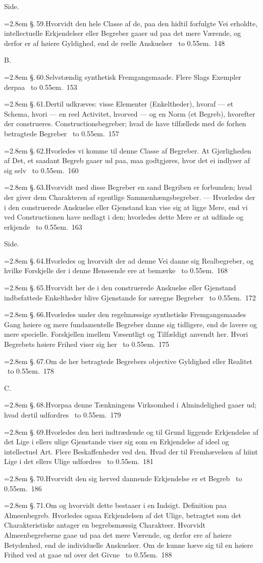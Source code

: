 \documentclass[12pt]{book}
\def\textit#1{#1}%
\def\\{ }%
\newcommand{\ovside}{\par\nopagebreak\hfill{\footnotesize Side.}\par\nobreak\vspace{0.2\baselineskip}}
\newcommand{\ovrubrik}[2]{%
  \par\vspace{0.9\baselineskip}%
  \begin{center}{\textit{#1}\par}\vspace{0.25\baselineskip}{#2\par}\end{center}
  \vspace{0.4\baselineskip}}
\newcommand{\ovline}[3]{%
  \par\vspace{0.25\baselineskip}%
  \noindent\hangindent=2.8em\hangafter=1
  \textit{\S.\,#1.}\quad #2%
  \nobreak\ \leaders\hbox to 0.55em{\hss.\hss}\hfill\ \textit{#3}\par}
\begin{document}
\ovside
\ovline{59}{Hvorvidt den hele Classe af de, paa den hidtil forfulgte Vei
  erholdte, intellectuelle Erkjendelser eller Begreber gaaer ud paa det mere
  Værende, og derfor er af høiere Gyldighed, end de reelle Anskuelser}{148}

\ovrubrik{B.}{Reel Synthese,\\
  eller\\
  reelle Anskuelsers eller Gjenstandes Frembringelse ved en selvstændig
  synthetisk Fremgangsmaade.}
\ovline{60}{Selvstændig synthetisk Fremgangsmaade. Flere Slags Exempler
  derpaa}{153}
\ovline{61}{Dertil udkræves: visse Elementer (Enkeltheder), hvoraf --- et
  Schema, hvori --- en reel Activitet, hvorved --- og en Norm (et Begreb),
  hvorefter der construeres. Constructionsbegreber; hvad de have tilfælleds med
  de forhen betragtede Begreber}{157}
\ovline{62}{Hvorledes vi komme til denne Classe af Begreber. At Gjørligheden
  af Det, et saadant Begreb gaaer ud paa, maa godtgjøres, hvor det ei indlyser
  af sig selv}{160}
\ovline{63}{Hvorvidt med disse Begreber en sand Begriben er forbunden; hvad
  der giver dem Charakteren af egentlige Sammenhængsbegreber. --- Hvorledes der
  i den construerede Anskuelse eller Gjenstand kan vise sig at ligge Mere, end
  vi ved Constructionen have nedlagt i den; hvorledes dette Mere er at udfinde
  og erkjende}{163}

\ovside
\ovline{64}{Hvorledes og hvorvidt der ad denne Vei danne sig Realbegreber, og
  hvilke Forskjelle der i denne Henseende ere at bemærke}{168}
\ovline{65}{Hvorvidt her de i den construerede Anskuelse eller Gjenstand
  indbefattede Enkeltheder blive Gjenstande for særegne Begreber}{172}
\ovline{66}{Hvorledes under den regelmæssige synthetiske Fremgangsmaades Gang
  høiere og mere fundamentelle Begreber danne sig tidligere, end de lavere og
  mere specielle. Forskjellen imellem Væsentligt og Tilfældigt anvendt her.
  Hvori Begrebets høiere Frihed viser sig her}{175}
\ovline{67}{Om de her betragtede Begrebers objective Gyldighed eller
  Realitet}{178}

\ovrubrik{C.}{Sammenlignings=Analyse\\
  eller\\
  Gjenstandes og Begrebers Analyse og Ordning ifølge Grundbegrebet om Lighed
  og Sammenhæng formedelst Lighed.}
\ovline{68}{Hvorpaa denne Tænkningens Virksomhed i Almindelighed gaaer ud;
  hvad dertil udfordres}{179}
\ovline{69}{Hvorledes den heri indtrædende og til Grund liggende Erkjendelse
  af det Lige i ellers ulige Gjenstande viser sig som en Erkjendelse af ideel
  og intellectuel Art. Flere Beskaffenheder ved den. Hvad der til Fremhævelsen
  af hiint Lige i det ellers Ulige udfordres}{181}
\ovline{70}{Hvorvidt den sig herved dannende Erkjendelse er et Begreb}{186}
\ovline{71}{Om og hvorvidt dette bestaaer i en Indsigt. Definition paa
  Almeenbegreb. Hvorledes ogsaa Erkjendelsen af det Ulige, betragtet som det
  Charakteristiske antager en begrebsmæssig Charakteer. Hvorvidt
  Almeenbegreberne gaae ud paa det mere Værende, og derfor ere af høiere
  Betydenhed, end de individuelle Anskuelser. Om de kunne hæve sig til en
  høiere Frihed ved at gaae ud over det Givne}{188}
\end{document}
